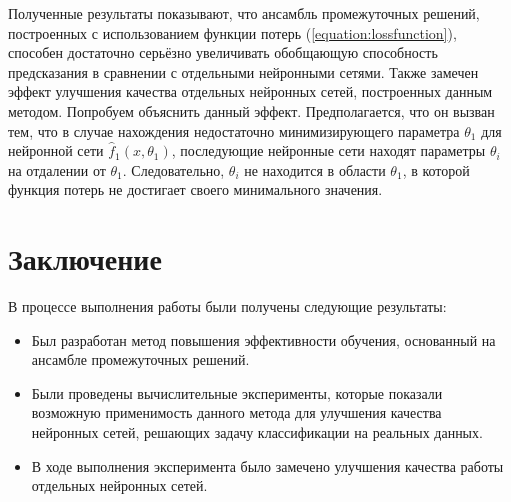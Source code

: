 \documentclass[12pt, fleqn]{article}
\newcommand{\predictionfunction}{\hat{f}}
\newcommand{\reference}[1]{(\hyperref[#1]{\ref{#1}})}
\begin{document}
Полученные результаты показывают, что ансамбль промежуточных решений, построенных с использованием функции потерь \reference{equation:lossfunction}, способен достаточно серьёзно увеличивать обобщающую способность предсказания в сравнении с отдельными нейронными сетями.
Также замечен эффект улучшения качества отдельных нейронных сетей, построенных данным методом. Попробуем объяснить данный эффект. Предполагается, что он вызван тем, что в случае нахождения недостаточно минимизирующего параметра $\theta_1$ для нейронной сети $\predictionfunction_1(x, \theta_1)$, последующие нейронные сети находят параметры $\theta_i$ на отдалении от $\theta_1$. Следовательно, $\theta_i$ не находится в области $\theta_1$, в которой функция потерь не достигает своего минимального значения.

\section{Заключение}

В процессе выполнения работы были получены следующие результаты:
\begin{itemize}
\item Был разработан метод повышения эффективности обучения, основанный на ансамбле промежуточных решений.
\item Были проведены вычислительные эксперименты, которые показали возможную применимость данного метода для улучшения качества нейронных сетей, решающих задачу классификации на реальных данных.
\item В ходе выполнения эксперимента было замечено улучшения качества работы отдельных нейронных сетей.
\end{itemize}
\end{document}
